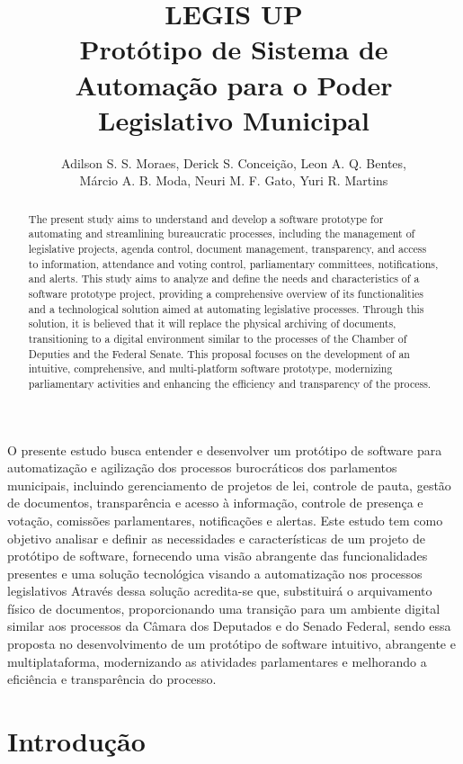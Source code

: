 \documentclass[12pt]{article}
\title{LEGIS UP\\ Protótipo de Sistema de Automação para o Poder Legislativo Municipal}
\author{
	Adilson S. S. Moraes\inst{1}, 
	Derick S. Conceição\inst{1}, 
	Leon A. Q. Bentes\inst{1}, \\
	Márcio A. B. Moda\inst{1}, 
	Neuri M. F. Gato\inst{1}, 
	Yuri R. Martins\inst{1}
}
\begin{document}
  

\maketitle

\begin{abstract}
  The present study aims to understand and develop a software prototype for automating and streamlining bureaucratic processes, including the management of legislative projects, agenda control, document management, transparency, and access to information, attendance and voting control, parliamentary committees, notifications, and alerts. This study aims to analyze and define the needs and characteristics of a software prototype project, providing a comprehensive overview of its functionalities and a technological solution aimed at automating legislative processes. Through this solution, it is believed that it will replace the physical archiving of documents, transitioning to a digital environment similar to the processes of the Chamber of Deputies and the Federal Senate. This proposal focuses on the development of an intuitive, comprehensive, and multi-platform software prototype, modernizing parliamentary activities and enhancing the efficiency and transparency of the process.
\end{abstract}
     
\begin{resumo} 
  O presente estudo busca entender e desenvolver um protótipo de software para automatização e agilização dos processos burocráticos dos parlamentos municipais, incluindo gerenciamento de projetos de lei, controle de pauta, gestão de documentos, transparência e acesso à informação, controle de presença e votação, comissões parlamentares, notificações e alertas. Este estudo tem como objetivo analisar e definir as necessidades e características de um projeto de protótipo de software, fornecendo uma visão abrangente das funcionalidades presentes e uma solução tecnológica visando a automatização nos processos legislativos Através dessa solução acredita-se que, substituirá o arquivamento físico de documentos, proporcionando uma transição para um ambiente digital similar aos processos da Câmara dos Deputados e do Senado Federal, sendo essa proposta no desenvolvimento de um protótipo de software intuitivo, abrangente e multiplataforma, modernizando as atividades parlamentares e melhorando a eficiência e transparência do processo.
\end{resumo}


\section{Introdução}
\end{document}

